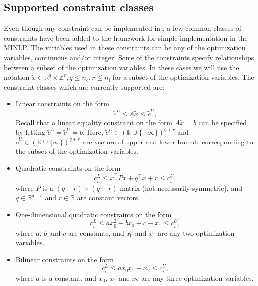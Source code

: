 \subsection{Supported constraint classes}
Even though any constraint can be implemented in \solvername, a few common classes of constraints have been added to the framework for simple implementation in the MINLP. The variables used in these constraints can be any of the optimization variables, continuous and/or integer. Some of the constraints specify relationships between a subset of the optimization variables. In these cases we will use the notation  $\tilde{x} \in \mathbb{R}^q \times \mathbb{Z}^r, q\leq n_{\mathrm{c}}, r \leq n_{\mathrm{i}}$ for a subset of the optimization variables. The constraint classes which are currently supported are:
\begin{itemize}
\item
Linear constraints on the form
\begin{equation}
\label{eqn:linear}
\tilde{c}^L \leq A \tilde{x} \leq \tilde{c}^U,
\end{equation}
Recall that a linear equality constraint on the form $A\tilde{x} = b$ can be specified by letting $\tilde{c}^L = \tilde{c}^U = b$. Here, $\tilde{c}^L \in (\mathbb{R} \cup \lbrace -\infty \rbrace)^{q+r}$ and $\tilde{c}^U \in ( \mathbb{R} \cup \lbrace \infty \rbrace)^{q+r}$ are vectors of upper and lower bounds corresponding to the subset of the optimization variables.
\item
Quadratic constraints on the form
\begin{equation}
\label{eqn:quadratic}
c_i^L \leq \tilde{x}^{\top} P \tilde{x} + q^{\top} \tilde{x} + r \leq c_i^U,
\end{equation}
where $P$ is a $(q+r) \times (q+r)$ matrix (not necessarily symmetric), and $q \in \mathbb{R}^{q+r}$ and $r \in \mathbb{R}$ are constant vectors.
\item
One-dimensional quadratic constraints on the form
\begin{equation}
\label{eqn:quadratic1d}
c_i^L \leq ax_0^2 + bx_0 + c - x_1 \leq c_i^U,
\end{equation}
where $a$, $b$ and $c$ are constants, and $x_0$ and $x_1$ are any two optimization variables.
\item
Bilinear constraints on the form
\begin{equation}
\label{eqn:bilinear}
c_i^L \leq ax_0 x_1 - x_2 \leq c_i^U,
\end{equation}
where $a$ is a constant, and $x_0$, $x_1$ and $x_2$ are any three optimization variables.

\end{itemize}
